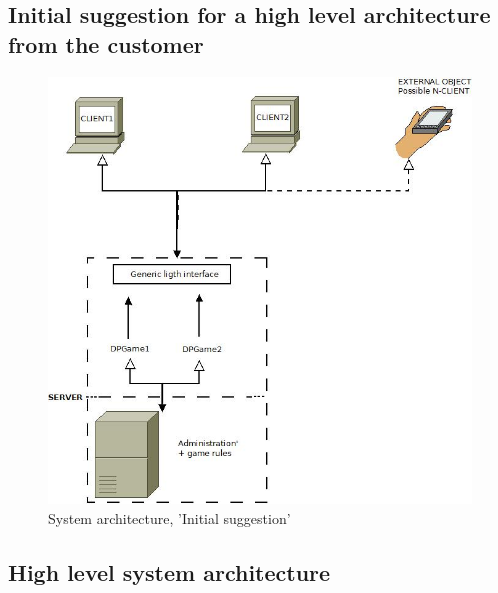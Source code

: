 \subsection{Initial suggestion for a high level architecture from the customer}

\begin{figure}[H]
  \centering
    \includegraphics[width=1.0\textwidth]{img/Client-serverarchitecture.jpeg}
  \caption{System architecture, 'Initial suggestion'} 
  \label{fig:initialsuggestion}
\end{figure}



\subsection{High level system architecture}

